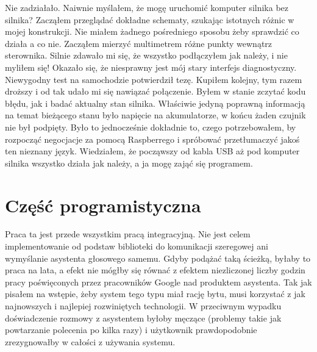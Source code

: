 \documentclass[declaration,shortabstract, inz]{iithesis}
\begin{document}
    Nie zadziałało. Naiwnie myślałem, że mogę uruchomić komputer silnika bez silnika? Zacząłem przeglądać dokładne schematy, szukając istotnych różnic w mojej konstrukcji. Nie miałem żadnego pośredniego sposobu żeby sprawdzić co działa a co nie. Zacząłem mierzyć multimetrem różne punkty wewnątrz sterownika. Silnie zdawało mi się, że wszystko podłączyłem jak należy, i nie myliłem się! Okazało się, że niesprawny jest mój stary interfejs diagnostyczny. Niewygodny test na samochodzie potwierdził tezę. Kupiłem kolejny, tym razem droższy i od tak udało mi się nawiązać połączenie. Byłem w stanie zczytać kodu błędu, jak i badać aktualny stan silnika. Właściwie jedyną poprawną informacją na temat bieżącego stanu było napięcie na akumulatorze, w końcu żaden czujnik nie był podpięty. Było to jednocześnie dokładnie to, czego potrzebowałem, by rozpocząć negocjacje za pomocą Raspberrego i spróbować przetłumaczyć jakoś ten nieznany język. Wiedziałem, że począwszy od kabla USB aż pod komputer silnika wszystko działa jak należy, a ja mogę zająć się programem.

\section{Część programistyczna}
    Praca ta jest przede wszystkim pracą integracyjną. Nie jest celem implementowanie od podstaw biblioteki do komunikacji szeregowej ani wymyślanie asystenta głosowego samemu. Gdyby podążać taką ścieżką, byłaby to praca na lata, a efekt nie mógłby się równać z efektem niezliczonej liczby godzin pracy poświęconych przez pracowników Google nad produktem asystenta. Tak jak pisałem na wstępie, żeby system tego typu miał rację bytu, musi korzystać z jak najnowszych i najlepiej rozwiniętych technologii. W przeciwnym wypadku doświadczenie rozmowy z asystentem byłoby męczące (problemy takie jak powtarzanie polecenia po kilka razy) i użytkownik prawdopodobnie zrezygnowałby w całości z używania systemu. 
    
\end{document}
